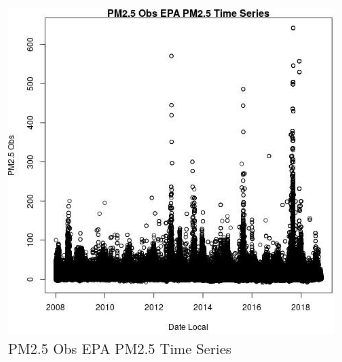 
\begin{figure} 
\centering  
\includegraphics[width=0.77\textwidth]{Code_Outputs/PM25Source1TSstep1_PM25_ObsvDate_Local.jpg} 
\caption{\label{fig:PM25Source1TSstep1PM25_ObsvDate_Local}PM2.5 Obs EPA PM2.5 Time Series} 
\end{figure} 
 
